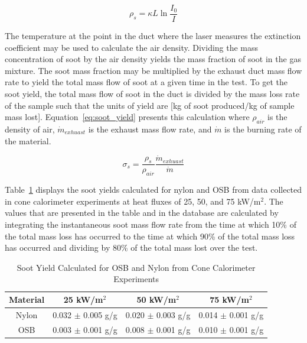 \documentclass[12pt,oneside]{book}
\begin{document}
\begin{equation}
\rho_s = \kappa{L}\ln{\frac{I_0}{I}}  \label{eq:extinction_coeff_manip}
\end{equation}

The temperature at the point in the duct where the laser measures the extinction coefficient may be used to calculate the air density. Dividing the mass concentration of soot by the air density yields the mass fraction of soot in the gas mixture. The soot mass fraction may be multiplied by the exhaust duct mass flow rate to yield the total mass flow of soot at a given time in the test. To get the soot yield, the total mass flow of soot in the duct is divided by the mass loss rate of the sample such that the units of yield are [kg of soot produced/kg of sample mass lost]. Equation~\ref{eq:soot_yield} presents this calculation where $\rho_{air}$ is the density of air, $\dot{m}_{exhuast}$ is the exhaust mass flow rate, and $\dot{m}$ is the burning rate of the material.

\begin{equation}
\sigma_s = \frac{\rho_s}{\rho_{air}}\frac{\dot{m}_{exhuast}}{\dot{m}}  \label{eq:soot_yield}
\end{equation}

Table~\ref{tab:soot_yield} displays the soot yields calculated for nylon and OSB from data collected in cone calorimeter experiments at heat fluxes of 25, 50, and 75 kW/m$^2$. The values that are presented in the table and in the database are calculated by integrating the instantaneous soot mass flow rate from the time at which 10\% of the total mass loss has occurred to the time at which 90\% of the total mass loss has occurred and dividing by 80\% of the total mass lost over the test.

\begin{table}[!ht]{}
\centering
\caption[Soot yield Calculated for OSB and Nylon from Cone Calorimeter Experiments]{Soot Yield Calculated for OSB and Nylon from Cone Calorimeter Experiments}
{\begin{tabular}{cccc}
\toprule
Material 		& 25 kW/m$^2$				& 50 kW/m$^2$ 				& 75 kW/m$^2$  \\
\midrule
Nylon 			& 0.032 $\pm$ 0.005 g/g		& 0.020 $\pm$ 0.003 g/g		& 0.014 $\pm$ 0.001 g/g   \\ 
OSB 			& 0.003 $\pm$ 0.001 g/g 	& 0.008 $\pm$ 0.001 g/g		& 0.010 $\pm$ 0.001 g/g    \\
\bottomrule
\end{tabular}}
\label{tab:soot_yield}
\end{table}
\end{document}
